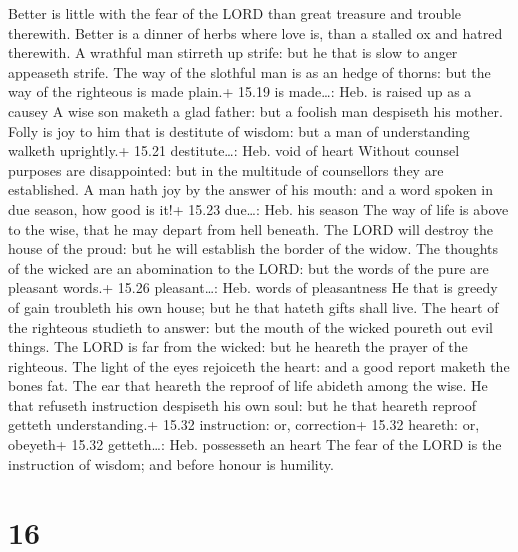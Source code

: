  Better is little with the fear of the LORD than great
treasure and trouble therewith.  Better is a dinner of
herbs where love is, than a stalled ox and hatred therewith.
 A wrathful man stirreth up strife: but he that is slow to
anger appeaseth strife.  The way of the slothful man is as
an hedge of thorns: but the way of the righteous is made plain.+ 15.19
is made\ldots: Heb. is raised up as a causey  A wise son
maketh a glad father: but a foolish man despiseth his mother.
 Folly is joy to him that is destitute of wisdom: but a man
of understanding walketh uprightly.+ 15.21 destitute\ldots: Heb. void of
heart  Without counsel purposes are disappointed: but in
the multitude of counsellors they are established.  A man
hath joy by the answer of his mouth: and a word spoken in due season,
how good is it!+ 15.23 due\ldots: Heb. his season  The way
of life is above to the wise, that he may depart from hell beneath.
 The LORD will destroy the house of the proud: but he will
establish the border of the widow.  The thoughts of the
wicked are an abomination to the LORD: but the words of the pure are
pleasant words.+ 15.26 pleasant\ldots: Heb. words of pleasantness
 He that is greedy of gain troubleth his own house; but he
that hateth gifts shall live.  The heart of the righteous
studieth to answer: but the mouth of the wicked poureth out evil things.
 The LORD is far from the wicked: but he heareth the prayer
of the righteous.  The light of the eyes rejoiceth the
heart: and a good report maketh the bones fat.  The ear
that heareth the reproof of life abideth among the wise. 
He that refuseth instruction despiseth his own soul: but he that heareth
reproof getteth understanding.+ 15.32 instruction: or, correction+ 15.32
heareth: or, obeyeth+ 15.32 getteth\ldots: Heb. possesseth an heart
 The fear of the LORD is the instruction of wisdom; and
before honour is humility.

\hypertarget{section-15}{%
\section{16}\label{section-15}}

